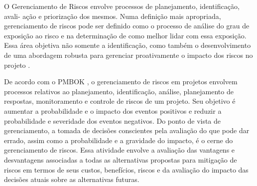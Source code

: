 O Gerenciamento de Riscos envolve processos de planejamento, identificação, avali- ação e priorização dos mesmos. Numa definição mais apropriada, gerenciamento de riscos pode ser definido como o processo de análise do grau de exposição ao risco e na determinação de como melhor lidar com essa exposição. Essa área objetiva não somente a identificação, como também o desenvolvimento de uma abordagem robusta para gerenciar proativamente o impacto dos riscos no projeto \cite{OSUNDAHUNSI2012}.

De acordo com o PMBOK \cite{PMBOK2008}, o gerenciamento de riscos em projetos envolvem processos relativos ao planejamento, identificação, análise, planejamento de respostas, monitoramento e controle de riscos de um projeto. Seu objetivo é aumentar a probabilidade e o impacto dos eventos positivos e reduzir a probabilidade e severidade dos eventos negativos. Do ponto de vista de gerenciamento, a tomada de decisões conscientes pela avaliação do que pode dar errado, assim como a probabilidade e a gravidade do impacto, é o cerne do gerenciamento de riscos. Essa atividade envolve a avaliação das vantagens e desvantagens associadas a todas as alternativas propostas para mitigação de riscos em termos de seus custos, benefícios, riscos e da avaliação do impacto das decisões atuais sobre as alternativas futuras.

